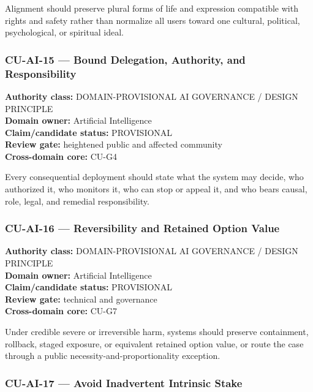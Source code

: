 \documentclass[
  11pt,
]{article}
\begin{document}
Alignment should preserve plural forms of life and expression compatible
with rights and safety rather than normalize all users toward one
cultural, political, psychological, or spiritual ideal.

\subsubsection{CU-AI-15 --- Bound Delegation, Authority, and
Responsibility}\label{cu-ai-15-bound-delegation-authority-and-responsibility}

\textbf{Authority class:} DOMAIN-PROVISIONAL AI GOVERNANCE / DESIGN
PRINCIPLE\\
\textbf{Domain owner:} Artificial Intelligence\\
\textbf{Claim/candidate status:} PROVISIONAL\\
\textbf{Review gate:} heightened public and affected community\\
\textbf{Cross-domain core:} CU-G4

Every consequential deployment should state what the system may decide,
who authorized it, who monitors it, who can stop or appeal it, and who
bears causal, role, legal, and remedial responsibility.

\subsubsection{CU-AI-16 --- Reversibility and Retained Option
Value}\label{cu-ai-16-reversibility-and-retained-option-value}

\textbf{Authority class:} DOMAIN-PROVISIONAL AI GOVERNANCE / DESIGN
PRINCIPLE\\
\textbf{Domain owner:} Artificial Intelligence\\
\textbf{Claim/candidate status:} PROVISIONAL\\
\textbf{Review gate:} technical and governance\\
\textbf{Cross-domain core:} CU-G7

Under credible severe or irreversible harm, systems should preserve
containment, rollback, staged exposure, or equivalent retained option
value, or route the case through a public necessity-and-proportionality
exception.

\subsubsection{CU-AI-17 --- Avoid Inadvertent Intrinsic
Stake}\label{cu-ai-17-avoid-inadvertent-intrinsic-stake}
\end{document}
